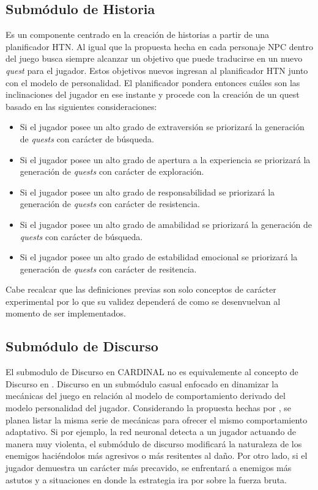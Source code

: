 \subsection{Submódulo de Historia}

Es un componente centrado en la creación de historias a partir de una planificador \ac{HTN}. Al igual que la propuesta hecha en \cite{breault2018let} cada personaje \ac{NPC} dentro del juego busca siempre alcanzar un objetivo que puede traducirse en un nuevo \textit{quest} para el jugador. Estos objetivos nuevos ingresan al planificador \ac{HTN} junto con el modelo de personalidad. El planificador pondera entonces cuáles son las inclinaciones del jugador en ese instante y procede con la creación de un quest basado en las siguientes consideraciones:

\begin{itemize}
\item Si el jugador posee un alto grado de extraversión se priorizará la generación de \textit{quests} con carácter de búsqueda.
\item Si el jugador posee un alto grado de apertura a la experiencia se priorizará la generación de \textit{quests} con carácter de exploración.
\item Si el jugador posee un alto grado de responsabilidad se priorizará la generación de \textit{quests} con carácter de resistencia.
\item Si el jugador posee un alto grado de amabilidad se priorizará la generación de \textit{quests} con carácter de búsqueda.
\item Si el jugador posee un alto grado de estabilidad emocional se priorizará la generación de \textit{quests} con carácter de resitencia.
\end{itemize}

Cabe recalcar que las definiciones previas son solo conceptos de carácter experimental por lo que su validez dependerá de como se desenvuelvan al momento de ser implementados.

\subsection{Submódulo de Discurso}

El submodulo de Discurso en CARDINAL no es equivalemente al concepto de Discurso en \cite{young2007story}. Discurso en un submódulo casual enfocado en dinamizar la mecánicas del juego en relación al modelo de comportamiento derivado del modelo personalidad del jugador. Considerando la propuesta hechas por \cite{de2018player}, se planea listar la misma serie de mecánicas para ofrecer el mismo comportamiento adaptativo. Si por ejemplo, la red neuronal detecta a un jugador actuando de manera muy violenta, el submódulo de discurso modificará la naturaleza de los enemigos haciéndolos más agresivos o más resitentes al daño. Por otro lado, si el jugador demuestra un carácter más precavido, se enfrentará a enemigos más astutos y a situaciones en donde la estrategia ira por sobre la fuerza bruta. 

